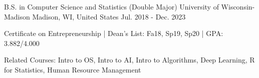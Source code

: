 

\begin{cventries}

  \cventry
  {B.S. in Computer Science and Statistics (Double Major)} %
  {University of Wisconsin-Madison} %
  {Madison, WI, United States} %
  {Jul. 2018 - Dec. 2023} %
  {
    \begin{cvitems} %
      \item {Certificate on Entrepreneurship | Dean's List: Fa18, Sp19, Sp20 | GPA: 3.882/4.000}
      \item {Related Courses: Intro to OS, Intro to AI, Intro to Algorithms, Deep Learning, R for Statistics, Human Resource Management}
    \end{cvitems}
  }

\end{cventries}
